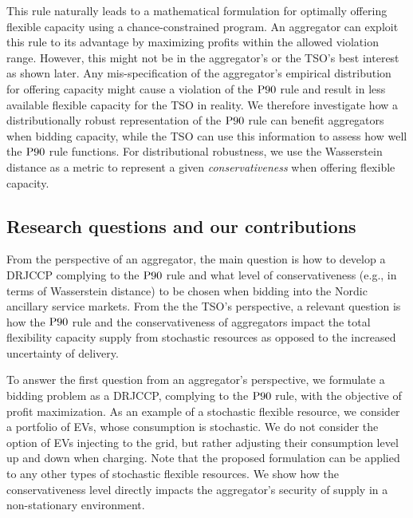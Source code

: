 \documentclass[conference]{IEEEtran}
\begin{document}
This rule naturally leads to a mathematical formulation for optimally offering flexible capacity using a chance-constrained program. An aggregator can exploit this rule to its advantage by maximizing profits within the allowed violation range. However, this might not be in the aggregator's or the \ac{TSO}'s best interest as shown later. Any mis-specification of the aggregator's empirical distribution for offering  capacity might cause a violation of the $\rm{P90}$ rule and result in less available flexible capacity for the \ac{TSO} in reality. We therefore investigate how a distributionally robust representation of the $\rm{P90}$ rule can benefit aggregators when bidding capacity, while the \ac{TSO} can use this information to assess how well the $\rm{P90}$ rule functions. For distributional robustness, we use the Wasserstein distance as a metric to represent a given \textit{conservativeness} when offering flexible capacity.

\vspace{2mm}
\subsection{Research questions and our contributions}
\vspace{-1mm}
From the perspective of an aggregator, the main question is how to develop a DRJCCP complying to the $\rm{P90}$ rule and what level of conservativeness (e.g., in terms of Wasserstein distance) to be chosen when bidding into the Nordic ancillary service markets. From the the \ac{TSO}'s perspective, a relevant question is 
how the $\rm{P90}$ rule and the conservativeness of aggregators impact the total flexibility capacity supply from stochastic resources as opposed to the increased uncertainty of delivery. %

To answer the first question from an aggregator's perspective, we formulate a bidding problem as a \ac{DRJCCP}, complying to the $\rm{P90}$ rule, with the objective of profit maximization.  
As an example of a stochastic flexible resource, we consider a portfolio of \acp{EV}, whose consumption  is stochastic. We do not consider the option of EVs injecting to the grid, but rather adjusting their consumption level up and down when charging. 
Note that the proposed formulation can be applied to any other types of stochastic flexible resources. 
We show how the conservativeness level directly impacts the aggregator's security of supply in a non-stationary environment.
\end{document}
